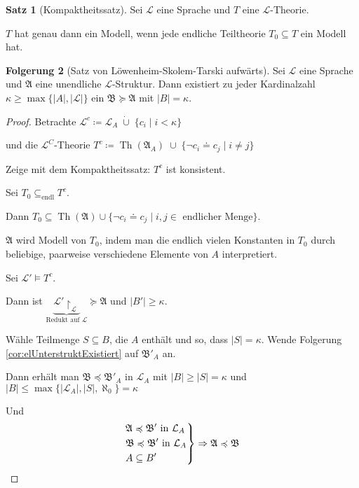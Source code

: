 \documentclass[12pt,parskip=full]{scrartcl}
\newcommand{\abs}[1]{{\left| #1 \right|}}
\theoremstyle{definition}
\newtheorem{theorem}{Satz}[section]
\newtheorem{corollary}[theorem]{Folgerung}
\begin{document}
	\begin{theorem}[Kompaktheitssatz]
		Sei $\mathcal{L}$ eine Sprache und $T$ eine $\mathcal{L}$-Theorie.
		
		$T$ hat genau dann ein Modell, wenn jede endliche Teiltheorie $T_0 \subseteq T$ ein Modell hat.
	\end{theorem}

	\begin{corollary}[Satz von Löwenheim-Skolem-Tarski aufwärts]
		Sei $\mathcal{L}$ eine Sprache und $\mathfrak{A}$ eine unendliche $\mathcal{L}$-Struktur.
		Dann existiert zu jeder Kardinalzahl $\kappa \geq \max \{ \abs{A}, \abs{\mathcal{L}} \}$ ein $\mathfrak{B} \succcurlyeq \mathfrak{A}$ mit $\abs{B} = \kappa$.
	\end{corollary}

	\begin{proof}
		Betrachte $\mathcal{L}^c \coloneqq \mathcal{L}_A \;\dot{\cup}\; \{ c_i \mid i < \kappa \}$
		
		und die $\mathcal{L}^C$-Theorie $T^c \coloneqq \operatorname{Th}(\mathfrak{A}_A) \;\cup\; \{ \lnot c_i \doteq c_j \mid i \neq j \}$
		
		Zeige mit dem Kompaktheitssatz: $T^c$ ist konsistent.
		
		Sei $T_0 \subseteq_\text{endl} T^c$.
		
		Dann $T_0 \subseteq \operatorname{Th}(\mathfrak{A}) \cup \{ \lnot c_i \doteq c_j \mid i,j \in \text{ endlicher Menge} \}$.
		
		$\mathfrak{A}$ wird Modell von $T_0$, indem man die endlich vielen Konstanten in $T_0$ durch beliebige, paarweise verschiedene Elemente von $A$ interpretiert.
		
		Sei $\mathcal{L}' \models T^c$.
		
		Dann ist $\underbrace{\mathcal{L}' \upharpoonright_\mathcal{L}}_\text{Redukt auf $\mathcal{L}$} \succcurlyeq \mathfrak{A}$ und $\abs{B'} \geq \kappa$.
		
		Wähle Teilmenge $S \subseteq B$, die $A$ enthält und so, dass $\abs{S} = \kappa$. Wende Folgerung \ref{cor:elUnterstruktExistiert} auf $\mathfrak{B}'_A$ an.
		
		Dann erhält man $\mathfrak{B} \preccurlyeq \mathfrak{B}'_A$ in $\mathcal{L}_A$ mit $\abs{B} \geq \abs{S} = \kappa$ und $\abs{B} \leq \max \{ \abs{\mathcal{L}_A}, \abs{S}, \aleph_0 \} = \kappa$
		
		Und
		\begin{equation*}
			\begin{drcases}
				\mathfrak{A} \preccurlyeq \mathfrak{B}' \text{ in $\mathcal{L}_A$} \\
				\mathfrak{B} \preccurlyeq \mathfrak{B}' \text{ in $\mathcal{L}_A$} \\
				A \subseteq B'
			\end{drcases} \Rightarrow \mathfrak{A} \preccurlyeq \mathfrak{B}
		\end{equation*}
	\end{proof}
\end{document}
